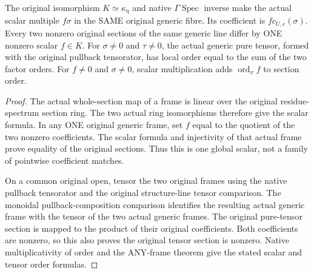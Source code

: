 \begin{lemma}
\label{lem:curve-generic-section-scalar-tensor-order}
\leanok
{}
The original isomorphism $K\simeq\kappa_\eta$ and native
$\Gamma\operatorname{Spec}$ inverse make the actual scalar multiple
$f\sigma$ in the SAME original generic fibre.  Its coefficient is
$f c_{U,e}(\sigma)$.  Every two nonzero original sections of the same
generic line differ by ONE nonzero scalar $f\in K$.
For $\sigma\ne0$ and $\tau\ne0$, the actual generic pure tensor,
formed with the original pullback tensorator, has local order equal to
the sum of the two factor orders.  For $f\ne0$ and $\sigma\ne0$, scalar
multiplication adds $\operatorname{ord}_x f$ to section order.
\end{lemma}
\begin{proof}
The actual whole-section map of a frame is linear over the original
residue-spectrum section ring.  The two actual ring isomorphisms
therefore give the scalar formula.  In any ONE original generic
frame, set $f$ equal to the quotient of the two nonzero coefficients.
The scalar formula and injectivity of that actual frame prove equality
of the original sections.  Thus this is one global scalar, not a family
of pointwise coefficient matches.

On a common original open, tensor the two original frames using the
native pullback tensorator and the original structure-line tensor
comparison.  The monoidal pullback-composition com\-parison identifies
the resulting actual ge\-neric frame with the tensor of the two actual
generic frames.  The original pure-tensor section is mapped to the
product of their original coefficients.  Both coefficients are
nonzero, so this also proves the original tensor section is nonzero.
Native multiplicativity of order and the ANY-frame theorem give the
stated scalar and tensor order formulas.
\end{proof}

